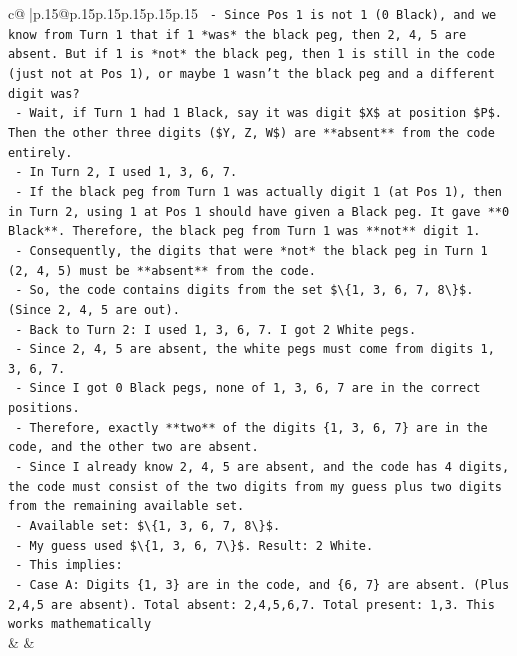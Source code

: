 \documentclass{article}
\begin{document}
{\begin{supertabular}{c@{$\;$}|p{.15\linewidth}@{}p{.15\linewidth}p{.15\linewidth}p{.15\linewidth}p{.15\linewidth}p{.15\linewidth}}
{{{\texttt{      {-} Since Pos 1 is not 1 (0 Black), and we know from Turn 1 that if 1 *was* the black peg, then 2, 4, 5 are absent. But if 1 is *not* the black peg, then 1 is still in the code (just not at Pos 1), or maybe 1 wasn't the black peg and a different digit was?} \\
\texttt{      {-} Wait, if Turn 1 had 1 Black, say it was digit \$X\$ at position \$P\$. Then the other three digits (\$Y, Z, W\$) are **absent** from the code entirely.} \\
\texttt{      {-} In Turn 2, I used 1, 3, 6, 7.} \\
\texttt{      {-} If the black peg from Turn 1 was actually digit 1 (at Pos 1), then in Turn 2, using 1 at Pos 1 should have given a Black peg. It gave **0 Black**. Therefore, the black peg from Turn 1 was **not** digit 1.} \\
\texttt{      {-} Consequently, the digits that were *not* the black peg in Turn 1 (2, 4, 5) must be **absent** from the code.} \\
\texttt{      {-} So, the code contains digits from the set \$\textbackslash{}\{1, 3, 6, 7, 8\textbackslash{}\}\$. (Since 2, 4, 5 are out).} \\
\texttt{      {-} Back to Turn 2: I used 1, 3, 6, 7. I got 2 White pegs.} \\
\texttt{        {-} Since 2, 4, 5 are absent, the white pegs must come from digits 1, 3, 6, 7.} \\
\texttt{        {-} Since I got 0 Black pegs, none of 1, 3, 6, 7 are in the correct positions.} \\
\texttt{        {-} Therefore, exactly **two** of the digits \{1, 3, 6, 7\} are in the code, and the other two are absent.} \\
\texttt{        {-} Since I already know 2, 4, 5 are absent, and the code has 4 digits, the code must consist of the two digits from my guess plus two digits from the remaining available set.} \\
\texttt{        {-} Available set: \$\textbackslash{}\{1, 3, 6, 7, 8\textbackslash{}\}\$.} \\
\texttt{        {-} My guess used \$\textbackslash{}\{1, 3, 6, 7\textbackslash{}\}\$. Result: 2 White.} \\
\texttt{        {-} This implies:} \\
\texttt{          {-} Case A: Digits \{1, 3\} are in the code, and \{6, 7\} are absent. (Plus 2,4,5 are absent). Total absent: 2,4,5,6,7. Total present: 1,3. This works mathematically} \\
            }
        }
    }
    & & \\ \\


\end{supertabular}}
\end{document}
